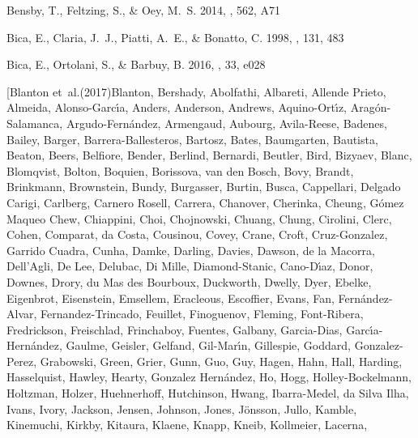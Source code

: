 \documentclass[onecolumn]{aa}
\begin{document}
\begin{thebibliography}{149}
	{Bensby}, T., {Feltzing}, S., \& {Oey}, M.~S. 2014, \aap, 562, A71
	
	{Bica}, E., {Claria}, J.~J., {Piatti}, A.~E., \& {Bonatto}, C. 1998, \aaps,
	131, 483
	
	{Bica}, E., {Ortolani}, S., \& {Barbuy}, B. 2016, \pasa, 33, e028
	
	\bibitem[{{Blanton} {et~al.}(2017){Blanton}, {Bershady}, {Abolfathi},
		{Albareti}, {Allende Prieto}, {Almeida}, {Alonso-Garc{\'\i}a}, {Anders},
		{Anderson}, {Andrews}, {Aquino-Ort{\'\i}z}, {Arag{\'o}n-Salamanca},
		{Argudo-Fern{\'a}ndez}, {Armengaud}, {Aubourg}, {Avila-Reese}, {Badenes},
		{Bailey}, {Barger}, {Barrera-Ballesteros}, {Bartosz}, {Bates}, {Baumgarten},
		{Bautista}, {Beaton}, {Beers}, {Belfiore}, {Bender}, {Berlind}, {Bernardi},
		{Beutler}, {Bird}, {Bizyaev}, {Blanc}, {Blomqvist}, {Bolton}, {Boquien},
		{Borissova}, {van den Bosch}, {Bovy}, {Brandt}, {Brinkmann}, {Brownstein},
		{Bundy}, {Burgasser}, {Burtin}, {Busca}, {Cappellari}, {Delgado Carigi},
		{Carlberg}, {Carnero Rosell}, {Carrera}, {Chanover}, {Cherinka}, {Cheung},
		{G{\'o}mez Maqueo Chew}, {Chiappini}, {Choi}, {Chojnowski}, {Chuang},
		{Chung}, {Cirolini}, {Clerc}, {Cohen}, {Comparat}, {da Costa}, {Cousinou},
		{Covey}, {Crane}, {Croft}, {Cruz-Gonzalez}, {Garrido Cuadra}, {Cunha},
		{Damke}, {Darling}, {Davies}, {Dawson}, {de la Macorra}, {Dell'Agli}, {De
			Lee}, {Delubac}, {Di Mille}, {Diamond-Stanic}, {Cano-D{\'\i}az}, {Donor},
		{Downes}, {Drory}, {du Mas des Bourboux}, {Duckworth}, {Dwelly}, {Dyer},
		{Ebelke}, {Eigenbrot}, {Eisenstein}, {Emsellem}, {Eracleous}, {Escoffier},
		{Evans}, {Fan}, {Fern{\'a}ndez-Alvar}, {Fernandez-Trincado}, {Feuillet},
		{Finoguenov}, {Fleming}, {Font-Ribera}, {Fredrickson}, {Freischlad},
		{Frinchaboy}, {Fuentes}, {Galbany}, {Garcia-Dias},
		{Garc{\'\i}a-Hern{\'a}ndez}, {Gaulme}, {Geisler}, {Gelfand},
		{Gil-Mar{\'\i}n}, {Gillespie}, {Goddard}, {Gonzalez-Perez}, {Grabowski},
		{Green}, {Grier}, {Gunn}, {Guo}, {Guy}, {Hagen}, {Hahn}, {Hall}, {Harding},
		{Hasselquist}, {Hawley}, {Hearty}, {Gonzalez Hern{\'a}ndez}, {Ho}, {Hogg},
		{Holley-Bockelmann}, {Holtzman}, {Holzer}, {Huehnerhoff}, {Hutchinson},
		{Hwang}, {Ibarra-Medel}, {da Silva Ilha}, {Ivans}, {Ivory}, {Jackson},
		{Jensen}, {Johnson}, {Jones}, {J{\"o}nsson}, {Jullo}, {Kamble}, {Kinemuchi},
		{Kirkby}, {Kitaura}, {Klaene}, {Knapp}, {Kneib}, {Kollmeier}, {Lacerna},
}
\end{thebibliography}
\end{document}
